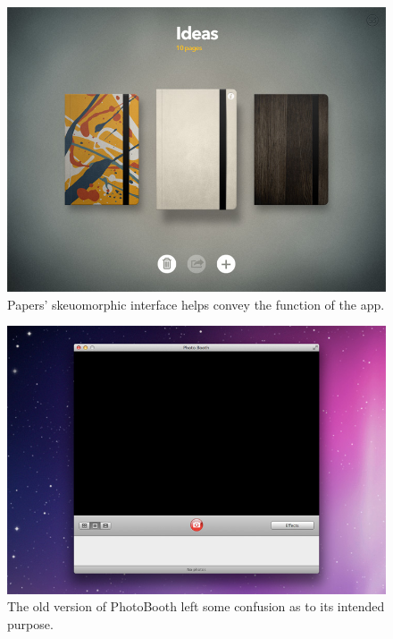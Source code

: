 \documentclass{article}
\begin{document}
\begin{figure}
\centering
\includegraphics[width=5in]{paperSmall.jpg}
\caption{Papers' skeuomorphic interface helps convey the function of the app.}
\label{Papers}
\end{figure}

\begin{figure}
\centering
\includegraphics [width=5in]{photoBoothOldSmall.jpg}
\caption{The old version of PhotoBooth left some confusion as to its intended purpose.}
\label{Old Photo Booth}
\end{figure}
\end{document}

